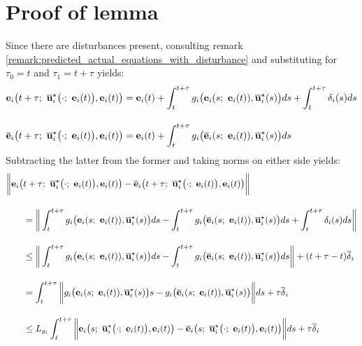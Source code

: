 \section{Proof of lemma }
\label{proof:lemma_diff_state_from_same_conditions}

Since there are disturbances present, consulting remark
\eqref{remark:predicted_actual_equations_with_disturbance} and substituting
for $\tau_0 = t$ and $\tau_1 = t + \tau$ yields:
\begin{align}
  \vect{e}_i\big(t + \tau;\ \overline{\vect{u}}_i^{\star}\big(\cdot;\ \vect{e}_i(t)\big), \vect{e}_i(t)\big) &=
    \vect{e}_i(t)
    + \int_{t}^{t + \tau} g_i\big(\vect{e}_i(s;\ \vect{e}_i(t)), \overline{\vect{u}}_i^{\star}(s)\big) ds
    + \int_{t}^{t + \tau}\delta_i(s)ds\\[2.5ex]
  \overline{\vect{e}}_i\big(t + \tau;\ \overline{\vect{u}}_i^{\star}\big(\cdot;\ \vect{e}_i(t)\big), \vect{e}_i(t)\big) &=
    \vect{e}_i(t) + \int_{t}^{t + \tau} g_i\big(\overline{\vect{e}}_i(s;\ \vect{e}_i(t)), \overline{\vect{u}}_i^{\star}(s)\big) ds
\end{align}
Subtracting the latter from the former and taking norms on either side yields:
\begin{align}
  \bigg\| \vect{e}_i\big(&t + \tau;\ \overline{\vect{u}}_i^{\star}\big(\cdot;\ \vect{e}_i(t)\big), \vect{e}_i(t)\big) -
  \overline{\vect{e}}_i\big(t + \tau;\ \overline{\vect{u}}_i^{\star}\big(\cdot;\ \vect{e}_i(t)\big), \vect{e}_i(t)\big) \bigg\| \\[2.5ex]
  &=\bigg\| \int_{t}^{t + \tau} g_i\big(\vect{e}_i(s;\ \vect{e}_i(t)), \overline{\vect{u}}_i^{\star}(s)\big) ds
     - \int_{t}^{t + \tau} g_i\big(\overline{\vect{e}}_i(s;\ \vect{e}_i(t)), \overline{\vect{u}}_i^{\star}(s)\big) ds
    + \int_{t}^{t + \tau}\delta_i(s)ds \bigg\| \\[2.5ex]
  & \leq \bigg\| \int_{t}^{t + \tau} g_i\big(\vect{e}_i(s;\ \vect{e}_i(t)), \overline{\vect{u}}_i^{\star}(s)\big) ds
     - \int_{t}^{t + \tau} g_i\big(\overline{\vect{e}}_i(s;\ \vect{e}_i(t)), \overline{\vect{u}}_i^{\star}(s)\big) ds \bigg\|
     + (t + \tau - t)\overline{\delta}_i \\[2.5ex]
  &=
     \int_{t}^{t + \tau} \bigg\| g_i\big(\vect{e}_i(s;\ \vect{e}_i(t)), \overline{\vect{u}}_i^{\star}(s)\big)s
     - g_i\big(\overline{\vect{e}}_i(s;\ \vect{e}_i(t)), \overline{\vect{u}}_i^{\star}(s)\big) \bigg\| ds + \tau \overline{\delta}_i\\[2.5ex]
  &\leq L_{g_i} \int_{t}^{t + \tau} \bigg\| \vect{e}_i\big(s;\ \overline{\vect{u}}_i^{\star}\big(\cdot;\ \vect{e}_i(t)\big), \vect{e}_i(t)\big) -
  \overline{\vect{e}}_i\big(s;\ \overline{\vect{u}}_i^{\star}\big(\cdot;\ \vect{e}_i(t)\big), \vect{e}_i(t)\big) \bigg\| ds + \tau \overline{\delta}_i  \\[2.5ex]
\end{align}
